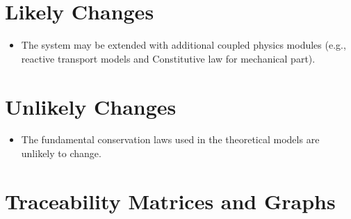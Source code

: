 \documentclass[12pt]{article}
\newcounter{lcnum} %
\begin{document}
\section{Likely Changes}

\begin{itemize}
\item[LC\refstepcounter{lcnum}\thelcnum\label{LC_Modules}:]
The system may be extended with additional coupled physics modules (e.g., reactive transport models and Constitutive law for mechanical part).
\end{itemize}

\section{Unlikely Changes}

\begin{itemize}
\item[LC\refstepcounter{lcnum}\thelcnum\label{LC_Fundamental}:]
The fundamental conservation laws used in the theoretical models are unlikely to change.
\end{itemize}

\section{Traceability Matrices and Graphs}
\end{document}
